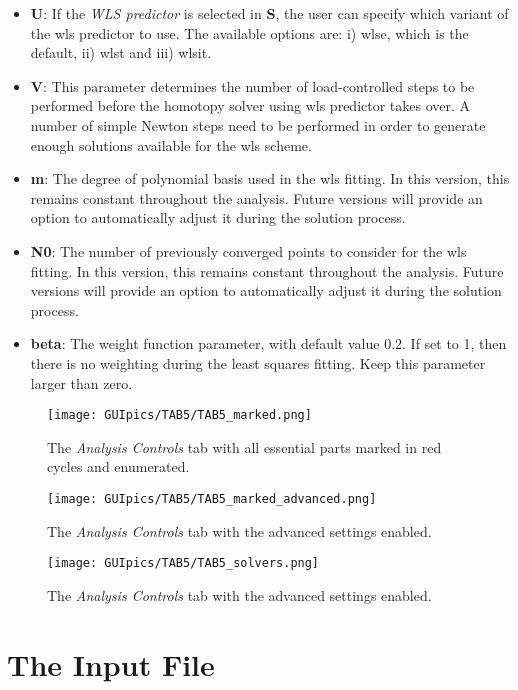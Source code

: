 \begin{itemize}
	\item \textbf{U}: If the \textit{WLS predictor} is selected in \textbf{S}, 
	the user can specify which variant of the \acrshort{wls} predictor to use. 
	The available options are: i) \acrshort{wlse}, which is the default, ii) 
	\acrshort{wlst} and iii) \acrshort{wlsit}.
	\item \textbf{V}: This parameter determines the number of load-controlled 
	steps to be performed before the homotopy solver using \acrshort{wls} 
	predictor takes over. A number of simple Newton steps need to be performed 
	in order to generate enough solutions available for the \acrshort{wls} 
	scheme.
	\item \textbf{m}: The degree of polynomial basis used in the \acrshort{wls} 
	fitting. In this version, this remains constant throughout the analysis. 
	Future versions will provide an option to automatically adjust it during 
	the solution process.
	\item \textbf{N0}: The number of previously converged points to consider 
	for the \acrshort{wls} fitting. In this version, this remains constant 
	throughout the analysis. Future versions will provide an option to 
	automatically adjust  it during the solution process.
	\item \textbf{beta}: The weight function parameter, with default value 0.2. 
	If set to 1, then there is no weighting during the least squares fitting. 
	Keep this parameter larger than zero.
\end{itemize}
\begin{figure}
	\centering
	\texttt{[image: GUIpics/TAB5/TAB5\_marked.png]}
	\caption{The \textit{Analysis Controls} tab with all essential parts 
		marked in red cycles and enumerated.}
	\label{fig:TAB5_marked}
\end{figure}

\begin{figure}
	\centering
	\texttt{[image: GUIpics/TAB5/TAB5\_marked\_advanced.png]}
	\caption{The \textit{Analysis Controls} tab with the advanced settings 
	enabled.}
	\label{fig:TAB5_marked_advanced}
\end{figure}

\begin{figure}
	\centering
	\texttt{[image: GUIpics/TAB5/TAB5\_solvers.png]}
	\caption{The \textit{Analysis Controls} tab with the advanced settings 
	enabled.}
	\label{fig:TAB5_solvers}
\end{figure}



\section{The Input File}\label{INPUTFILE}



